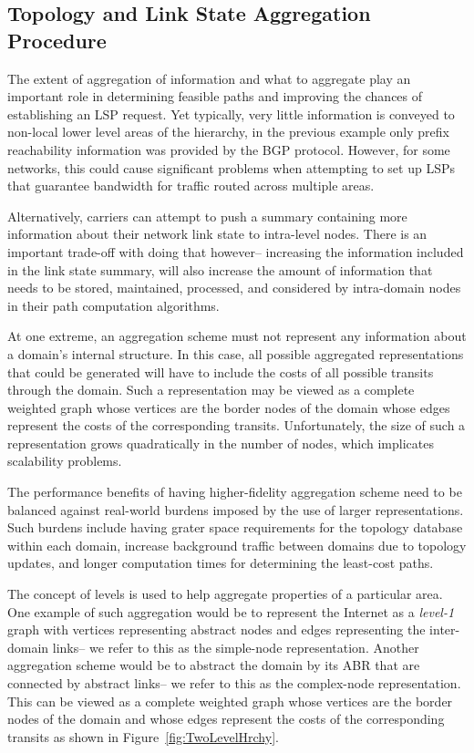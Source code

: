 \subsection{Topology and Link State Aggregation Procedure}
\label{TopologyLinkStateAggregation}
The extent of aggregation of information and what to aggregate play an important role in determining feasible paths and improving the chances of establishing an LSP request. Yet typically, very little information is conveyed to non-local lower level areas of the hierarchy, \eg in the previous example only prefix reachability information was provided by the BGP protocol. However, for some networks, this could cause significant problems when attempting to set up LSPs that guarantee bandwidth for traffic routed across multiple areas.

Alternatively, carriers can attempt to push a summary containing more information about their network link state to intra-level nodes. There is an important trade-off with doing that however-- \ie increasing the information included in the link state summary, will also increase the amount of information that needs to be stored, maintained, processed, and considered by intra-domain nodes in their path computation algorithms.

At one extreme, an aggregation scheme must not represent any information about a domain's internal structure. In this case, all possible aggregated representations that could be generated will have to include the costs of all possible transits through the domain. Such a representation may be viewed as a complete weighted graph whose vertices are the border nodes of the domain whose edges represent the costs of the corresponding transits. Unfortunately, the size of such a representation grows quadratically in the number of nodes, which implicates scalability problems.

The performance benefits of having higher-fidelity aggregation scheme need to be balanced against real-world burdens imposed by the use of larger representations. Such burdens include having grater space requirements for the topology database within each domain, increase background traffic between domains due to topology updates, and longer computation times for determining the least-cost paths.

The concept of levels is used to help aggregate properties of a particular area. One example of such aggregation would be to represent the Internet as a \emph{level-1} graph with vertices representing abstract nodes and edges representing the inter-domain links-- we refer to this as the simple-node representation. Another aggregation scheme would be to abstract the domain by its ABR that are connected by abstract links-- we refer to this as the complex-node representation. This can be viewed as a complete weighted graph whose vertices are the border nodes of the domain and whose edges represent the costs of the corresponding transits as shown in Figure~\ref{fig:TwoLevelHrchy}.

